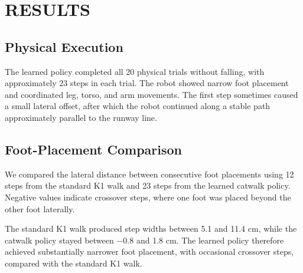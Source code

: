 \section{RESULTS}

\subsection{Physical Execution}

The learned policy completed all 20 physical trials without falling, with approximately 23 steps in each trial. The robot showed narrow foot placement and coordinated leg, torso, and arm movements. The first step sometimes caused a small lateral offset, after which the robot continued along a stable path approximately parallel to the runway line.

\subsection{Foot-Placement Comparison}

We compared the lateral distance between consecutive foot placements using 12 steps from the standard K1 walk and 23 steps from the learned catwalk policy. Negative values indicate crossover steps, where one foot was placed beyond the other foot laterally.

The standard K1 walk produced step widths between 5.1 and 11.4 cm, while the catwalk policy stayed between $-0.8$ and 1.8 cm. The learned policy therefore achieved substantially narrower foot placement, with occasional crossover steps, compared with the standard K1 walk.

